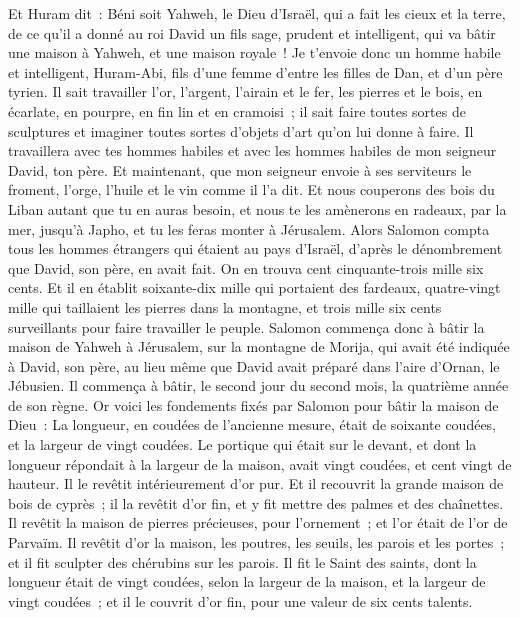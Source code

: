 \begin{multicols}{2}
Et Huram dit~: Béni soit Yahweh, le Dieu d'Israël, qui a fait les cieux et la terre, de ce qu'il a donné au roi David un fils sage, prudent et intelligent, qui va bâtir une maison à Yahweh, et une maison royale~!
Je t'envoie donc un homme habile et intelligent, Huram-Abi,
fils d'une femme d'entre les filles de Dan, et d'un père tyrien. Il sait travailler l'or, l'argent, l'airain et le fer, les pierres et le bois, en écarlate, en pourpre, en fin lin et en cramoisi~; il sait faire toutes sortes de sculptures et imaginer toutes sortes d'objets d'art qu'on lui donne à faire. Il travaillera avec tes hommes habiles et avec les hommes habiles de mon seigneur David, ton père.
Et maintenant, que mon seigneur envoie à ses serviteurs le froment, l'orge, l'huile et le vin comme il l'a dit.
Et nous couperons des bois du Liban autant que tu en auras besoin, et nous te les amènerons en radeaux, par la mer, jusqu'à Japho, et tu les feras monter à Jérusalem.
Alors Salomon compta tous les hommes étrangers qui étaient au pays d'Israël, d'après le dénombrement que David, son père, en avait fait. On en trouva cent cinquante-trois mille six cents.
Et il en établit soixante-dix mille qui portaient des fardeaux, quatre-vingt mille qui taillaient les pierres dans la montagne, et trois mille six cents surveillants pour faire travailler le peuple.
\VerseOne{}Salomon commença donc à bâtir la maison de Yahweh à Jérusalem, sur la montagne de Morija, qui avait été indiquée à David, son père, au lieu même que David avait préparé dans l'aire d'Ornan, le Jébusien.
Il commença à bâtir, le second jour du second mois, la quatrième année de son règne.
Or voici les fondements fixés par Salomon pour bâtir la maison de Dieu~: La longueur, en coudées de l'ancienne mesure, était de soixante coudées, et la largeur de vingt coudées.
Le portique qui était sur le devant, et dont la longueur répondait à la largeur de la maison, avait vingt coudées, et cent vingt de hauteur. Il le revêtit intérieurement d'or pur.
Et il recouvrit la grande maison de bois de cyprès~; il la revêtit d'or fin, et y fit mettre des palmes et des chaînettes.
Il revêtit la maison de pierres précieuses, pour l'ornement~; et l'or était de l'or de Parvaïm.
Il revêtit d'or la maison, les poutres, les seuils, les parois et les portes~; et il fit sculpter des chérubins sur les parois.
Il fit le Saint des saints, dont la longueur était de vingt coudées, selon la largeur de la maison, et la largeur de vingt coudées~; et il le couvrit d'or fin, pour une valeur de six cents talents.

\end{multicols}
